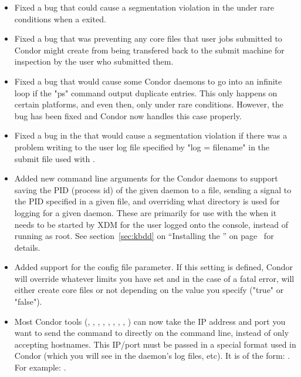 \begin{itemize}

\item Fixed a bug that could cause a segmentation violation in the 
 under rare conditions when a  exited.

\item Fixed a bug that was preventing any core files that user jobs
submitted to Condor might create from being transfered back to the
submit machine for inspection by the user who submitted them.

\item Fixed a bug that would cause some Condor daemons to go into an
infinite loop if the "ps" command output duplicate entries.
This only happens on certain platforms, and even then, only under rare
conditions.
However, the bug has been fixed and Condor now handles this case
properly.

\item Fixed a bug in the  that would cause a
segmentation violation if there was a problem writing to the user log
file specified by "log = filename" in the submit file used with
.

\item Added new command line arguments for the Condor daemons to support
saving the PID (process id) of the given daemon to a file, sending a
signal to the PID specified in a given file, and overriding what
directory is used for logging for a given daemon.
These are primarily for use with the  when it needs to be
started by XDM for the user logged onto the console, instead of
running as root.
See section~\ref{sec:kbdd} on ``Installing the '' on
page~\pageref{sec:kbdd} for details.

\item Added support for the  config file
parameter.  
If this setting is defined, Condor will override whatever limits you
have set and in the case of a fatal error, will either create core
files or not depending on the value you specify ("true" or "false").

\item Most Condor tools (, ,
, , ,
, , ,
) can now take the IP address and port you want to
send the command to directly on the command line, instead of only
accepting hostnames. 
This IP/port must be passed in a special format used in Condor (which
you will see in the daemon's log files, etc).
It is of the form: .  
For example: .

\end{itemize}

